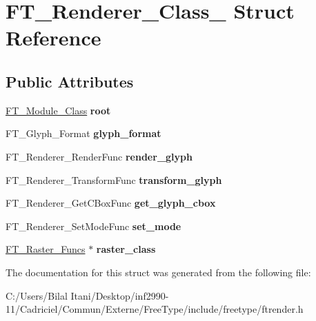 \hypertarget{struct_f_t___renderer___class__}{}\section{F\+T\+\_\+\+Renderer\+\_\+\+Class\+\_\+ Struct Reference}
\label{struct_f_t___renderer___class__}
\subsection*{Public Attributes}
\begin{DoxyCompactItemize}
\item 
\hyperlink{struct_f_t___module___class__}{F\+T\+\_\+\+Module\+\_\+\+Class} {\bfseries root}\hypertarget{struct_f_t___renderer___class___a3df4509f1de704596bf4237d6ff8cbd4}{}\label{struct_f_t___renderer___class___a3df4509f1de704596bf4237d6ff8cbd4}

\item 
F\+T\+\_\+\+Glyph\+\_\+\+Format {\bfseries glyph\+\_\+format}\hypertarget{struct_f_t___renderer___class___a2c8602452fae27379a6f85bbcb4b525c}{}\label{struct_f_t___renderer___class___a2c8602452fae27379a6f85bbcb4b525c}

\item 
F\+T\+\_\+\+Renderer\+\_\+\+Render\+Func {\bfseries render\+\_\+glyph}\hypertarget{struct_f_t___renderer___class___a7a022b8358ce3a06620c62f3542d0d2b}{}\label{struct_f_t___renderer___class___a7a022b8358ce3a06620c62f3542d0d2b}

\item 
F\+T\+\_\+\+Renderer\+\_\+\+Transform\+Func {\bfseries transform\+\_\+glyph}\hypertarget{struct_f_t___renderer___class___a2aef09ecdabacf5628ef29fb3d179def}{}\label{struct_f_t___renderer___class___a2aef09ecdabacf5628ef29fb3d179def}

\item 
F\+T\+\_\+\+Renderer\+\_\+\+Get\+C\+Box\+Func {\bfseries get\+\_\+glyph\+\_\+cbox}\hypertarget{struct_f_t___renderer___class___a4f9dc9b6d86504a8d3b04b4e72936e76}{}\label{struct_f_t___renderer___class___a4f9dc9b6d86504a8d3b04b4e72936e76}

\item 
F\+T\+\_\+\+Renderer\+\_\+\+Set\+Mode\+Func {\bfseries set\+\_\+mode}\hypertarget{struct_f_t___renderer___class___a7cfd4795107157aad4f7efcab77a0f64}{}\label{struct_f_t___renderer___class___a7cfd4795107157aad4f7efcab77a0f64}

\item 
\hyperlink{struct_f_t___raster___funcs__}{F\+T\+\_\+\+Raster\+\_\+\+Funcs} $\ast$ {\bfseries raster\+\_\+class}\hypertarget{struct_f_t___renderer___class___a5af75b9f582f98f9f74dbcbc530c7e88}{}\label{struct_f_t___renderer___class___a5af75b9f582f98f9f74dbcbc530c7e88}

\end{DoxyCompactItemize}


The documentation for this struct was generated from the following file\+:\begin{DoxyCompactItemize}
\item 
C\+:/\+Users/\+Bilal Itani/\+Desktop/inf2990-\/11/\+Cadriciel/\+Commun/\+Externe/\+Free\+Type/include/freetype/ftrender.\+h\end{DoxyCompactItemize}
